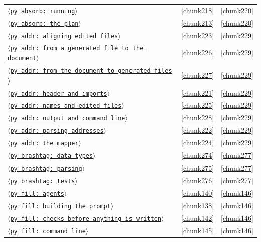 \documentclass[10pt,a4paper]{article}
\newcounter{chunk}
\newcommand{\chunkname}[1]{\ensuremath{\langle}\texttt{#1}\ensuremath{\rangle}}
\begin{document}
\begin{longtable}{@{}p{}rp{}@{}}
\hyperref[chunk218]{\chunkname{py absorb: running}} & \ref*{chunk218} & \hyperref[chunk220]{\ref*{chunk220}} \\
\hyperref[chunk213]{\chunkname{py absorb: the plan}} & \ref*{chunk213} & \hyperref[chunk220]{\ref*{chunk220}} \\
\hyperref[chunk223]{\chunkname{py addr: aligning edited files}} & \ref*{chunk223} & \hyperref[chunk229]{\ref*{chunk229}} \\
\hyperref[chunk226]{\chunkname{py addr: from a generated file to the document}} & \ref*{chunk226} & \hyperref[chunk229]{\ref*{chunk229}} \\
\hyperref[chunk227]{\chunkname{py addr: from the document to generated files}} & \ref*{chunk227} & \hyperref[chunk229]{\ref*{chunk229}} \\
\hyperref[chunk221]{\chunkname{py addr: header and imports}} & \ref*{chunk221} & \hyperref[chunk229]{\ref*{chunk229}} \\
\hyperref[chunk225]{\chunkname{py addr: names and edited files}} & \ref*{chunk225} & \hyperref[chunk229]{\ref*{chunk229}} \\
\hyperref[chunk228]{\chunkname{py addr: output and command line}} & \ref*{chunk228} & \hyperref[chunk229]{\ref*{chunk229}} \\
\hyperref[chunk222]{\chunkname{py addr: parsing addresses}} & \ref*{chunk222} & \hyperref[chunk229]{\ref*{chunk229}} \\
\hyperref[chunk224]{\chunkname{py addr: the mapper}} & \ref*{chunk224} & \hyperref[chunk229]{\ref*{chunk229}} \\
\hyperref[chunk274]{\chunkname{py brashtag: data types}} & \ref*{chunk274} & \hyperref[chunk277]{\ref*{chunk277}} \\
\hyperref[chunk275]{\chunkname{py brashtag: parsing}} & \ref*{chunk275} & \hyperref[chunk277]{\ref*{chunk277}} \\
\hyperref[chunk276]{\chunkname{py brashtag: tests}} & \ref*{chunk276} & \hyperref[chunk277]{\ref*{chunk277}} \\
\hyperref[chunk140]{\chunkname{py fill: agents}} & \ref*{chunk140} & \hyperref[chunk146]{\ref*{chunk146}} \\
\hyperref[chunk138]{\chunkname{py fill: building the prompt}} & \ref*{chunk138} & \hyperref[chunk146]{\ref*{chunk146}} \\
\hyperref[chunk142]{\chunkname{py fill: checks before anything is written}} & \ref*{chunk142} & \hyperref[chunk146]{\ref*{chunk146}} \\
\hyperref[chunk145]{\chunkname{py fill: command line}} & \ref*{chunk145} & \hyperref[chunk146]{\ref*{chunk146}} \\

\end{longtable}
\end{document}
